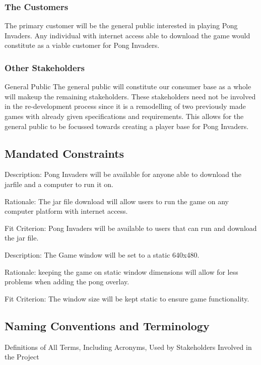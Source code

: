 \documentclass[12pt, titlepage]{article}
\begin{document}
\subsubsection{The Customers}
The primary customer will be the general public interested in playing Pong
Invaders. Any individual with internet access able to download the game would
constitute as a viable customer for Pong Invaders.
\subsubsection{Other Stakeholders}
General Public
The general public will constitute our consumer base as a whole will makeup the
remaining stakeholders. These stakeholders need not be involved in the
re-development process since it is a remodelling of two previously made games
with already given specifications and requirements. This allows for the general
public to be focussed towards creating a player base for Pong Invaders.
\subsection{Mandated Constraints}
Description: Pong Invaders will be available for anyone able to download the
jarfile and a computer to run it on.
 
Rationale: The jar file download will allow users to run the game on any
computer platform with internet access.
 
Fit Criterion: Pong Invaders will be available to users that can run and
download the jar file.
 

Description: The Game window will be set to a static 640x480.
 
Rationale: keeping the game on static window dimensions will allow for less
problems when adding the pong overlay.
 
Fit Criterion: The window size will be kept static to ensure game
functionality.

\subsection{Naming Conventions and Terminology}

Definitions of All Terms, Including Acronyms, Used by Stakeholders Involved in
the Project
\end{document}
